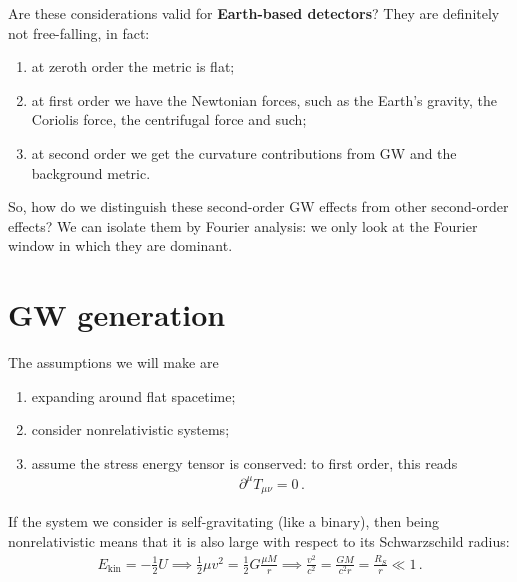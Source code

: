 \documentclass[main.tex]{subfiles}
\begin{document}


Are these considerations valid for \textbf{Earth-based detectors}? 
They are definitely not free-falling, in fact: 
\begin{enumerate}
  \item at zeroth order the metric is flat;
  \item at first order we have the Newtonian forces, such as the Earth's gravity, the Coriolis force, the centrifugal force and such;
  \item at second order we get the curvature contributions from GW and the background metric.
\end{enumerate}

So, how do we distinguish these second-order GW effects from other second-order effects?
We can isolate them by Fourier analysis: we only look at the Fourier window in which they are dominant. 




\section{GW generation}

The assumptions we will make are 
\begin{enumerate}
  \item expanding around flat spacetime;
  \item consider nonrelativistic systems;
  \item assume the stress energy tensor is conserved: to first order, this reads 
  \begin{align}
  \partial^{\mu} T_{\mu \nu } = 0
  \,.
  \end{align}  
\end{enumerate}

If the system we consider is self-gravitating (like a binary), then being nonrelativistic means that it is also large with respect to its Schwarzschild radius:
%
\begin{align}
E _{\text{kin}} = 
- \frac{1}{2} U \implies 
\frac{1}{2} 
\mu v^2 = 
\frac{1}{2} G \frac{\mu M}{r} 
\implies \frac{v^2}{c^2} 
= \frac{GM}{c^2 r} 
= \frac{R_S}{r} \ll 1
\,.
\end{align}
\end{document}
